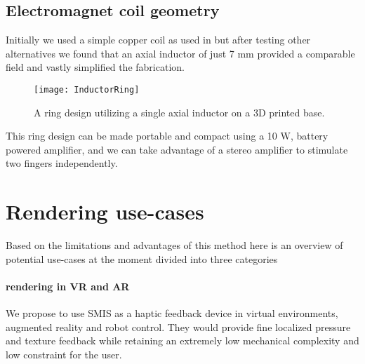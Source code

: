 \documentclass[10pt,journal,compsoc]{IEEEtran}
\begin{document}
	\subsection{Electromagnet coil geometry}

	Initially we used a simple copper coil as used in \cite{hameed2010ieee} but after testing other alternatives we found that an axial inductor of just 7 mm provided a comparable field and vastly simplified the fabrication. 

	
	\begin{figure}[!t]
		\centering
		\texttt{[image: InductorRing]}
		\caption{A ring design utilizing a single axial inductor on a 3D printed base.}
		\label{InductorRing}
	\end{figure}	
	
This ring design can be made portable and compact using a 10 W, battery powered amplifier, and we can take advantage of a stereo amplifier to stimulate two fingers independently.

\section{Rendering use-cases}
	Based on the limitations and advantages of this method here is an overview of potential use-cases at the moment divided into three categories
	\paragraph{rendering in VR and AR}
	We propose to use SMIS as a haptic feedback device in virtual environments, augmented reality and robot control. They would provide fine localized pressure and texture feedback while retaining an extremely low mechanical complexity and low constraint for the user.
	
\end{document}
